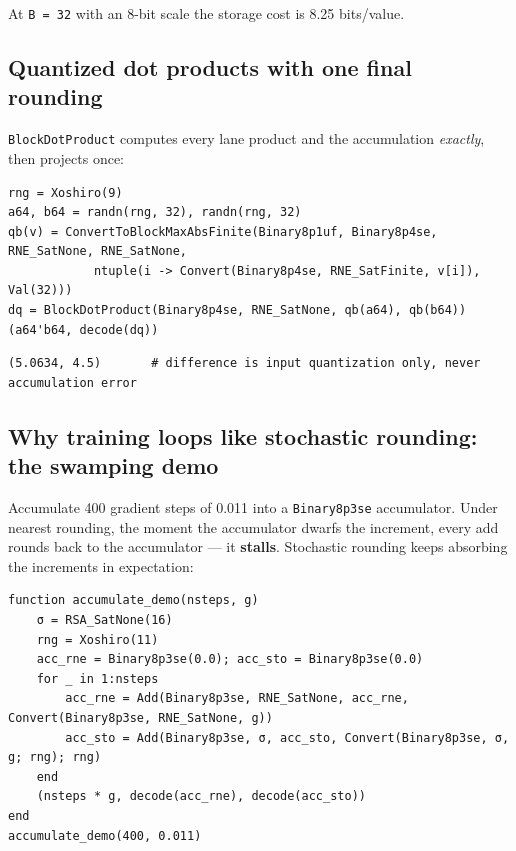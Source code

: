 At \texttt{B = 32} with an 8-bit scale the storage cost is 8.25 bits/value.



\subsection{Quantized dot products with one final rounding}



\label{1256464788428311555}{}


\texttt{BlockDotProduct} computes every lane product and the accumulation \emph{exactly}, then projects once:




\begin{verbatim}
rng = Xoshiro(9)
a64, b64 = randn(rng, 32), randn(rng, 32)
qb(v) = ConvertToBlockMaxAbsFinite(Binary8p1uf, Binary8p4se, RNE_SatNone, RNE_SatNone,
            ntuple(i -> Convert(Binary8p4se, RNE_SatFinite, v[i]), Val(32)))
dq = BlockDotProduct(Binary8p4se, RNE_SatNone, qb(a64), qb(b64))
(a64'b64, decode(dq))
\end{verbatim}




\begin{verbatim}
(5.0634, 4.5)       # difference is input quantization only, never accumulation error
\end{verbatim}



\subsection{Why training loops like stochastic rounding: the swamping demo}



\label{3016318026063494718}{}


Accumulate 400 gradient steps of 0.011 into a \texttt{Binary8p3se} accumulator. Under nearest rounding, the moment the accumulator dwarfs the increment, every add rounds back to the accumulator — it \textbf{stalls}. Stochastic rounding keeps absorbing the increments in expectation:




\begin{verbatim}
function accumulate_demo(nsteps, g)
    σ = RSA_SatNone(16)
    rng = Xoshiro(11)
    acc_rne = Binary8p3se(0.0); acc_sto = Binary8p3se(0.0)
    for _ in 1:nsteps
        acc_rne = Add(Binary8p3se, RNE_SatNone, acc_rne, Convert(Binary8p3se, RNE_SatNone, g))
        acc_sto = Add(Binary8p3se, σ, acc_sto, Convert(Binary8p3se, σ, g; rng); rng)
    end
    (nsteps * g, decode(acc_rne), decode(acc_sto))
end
accumulate_demo(400, 0.011)
\end{verbatim}




